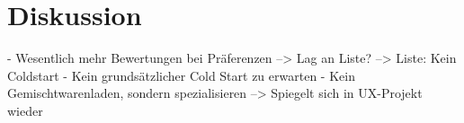 \chapter{Diskussion}
\label{ch:diskussion}
- Wesentlich mehr Bewertungen bei Präferenzen --> Lag an Liste? --> Liste: Kein Coldstart
- Kein grundsätzlicher Cold Start zu erwarten
- Kein Gemischtwarenladen, sondern spezialisieren --> Spiegelt sich in UX-Projekt wieder



